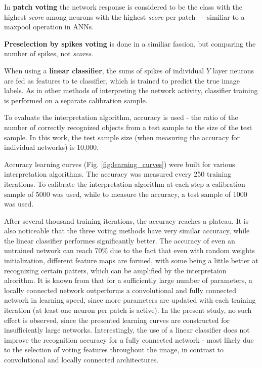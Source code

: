 \documentclass[a4paper,10pt]{article}
\begin{document}
In \textbf{patch voting} the network response is considered to be the class with the highest \textit{score} among neurons with the highest \textit{score} per patch --- similiar to a maxpool operation in ANNs.

\textbf{Preselection by spikes voting} is done in a similiar fassion, but comparing the number of spikes, not \textit{scores}.

When using a \textbf{linear classifier}, the sums of spikes of individual  $ Y $ layer neurons are fed as features to te classifier, which is trained to predict the true image labels. As in other methods of interpreting the network activity, classifier training is performed on a separate calibration sample.

To evaluate the interpretation algorithm, accuracy is used - the ratio of the number of correctly recognized objects from a test sample to the size of the test sample. In this work, the test sample size (when measuring the accuracy for individual networks) is 10,000.

Accuracy learning curves (Fig. \ref{fig:learning_curves}) were built for various interpretation algorithms. The accuracy was measured every 250 training iterations. To calibrate the interpretation algorithm at each step a calibration sample of 5000 was used, while to measure the accuracy, a test sample of 1000 was used.

After several thousand training iterations, the accuracy reaches a plateau. It is also noticeable that the three voting methods have very similar accuracy, while the linear classifier performes significantly better. The accuracy of even an untrained network can reach 70\% due to the fact that even with random weights initialization, different feature maps are formed, with some being a little better at recognizing certain patters, which can be amplified by the interpretaion alrorithm. It is known from \cite{saunders2019locally} that for a sufficiently large number of parameters, a locally connected network outperforms a convolutional and fully connected network in learning speed, since more parameters are updated with each training iteration (at least one neuron per patch is active). In the present study, no such effect is observed, since the presented learning curves are constructed for insufficiently large networks. Interestingly, the use of a linear classifier does not improve the recognition accuracy for a fully connected network - most likely due to the selection of voting features throughout the image, in contrast to convolutional and locally connected architectures.
\end{document}
